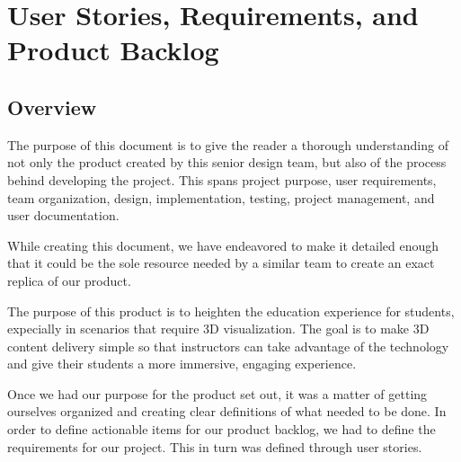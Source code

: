 
\chapter{User Stories,  Requirements, and Product Backlog}



\section{Overview}


The purpose of this document is to give the reader a thorough understanding of
not only the product created by this senior design team, but also of the
process behind developing the project. This spans project purpose, user
requirements, team organization, design, implementation, testing, project
management, and user documentation.

While creating this document, we have endeavored to make it detailed enough
that it could be the sole resource needed by a similar team to create an exact
replica of our product.

The purpose of this product is to heighten the education experience for
students, expecially in scenarios that require 3D visualization. The goal is to
make 3D content delivery simple so that instructors can take advantage of the
technology and give their students a more immersive, engaging experience.

Once we had our purpose for the product set out, it was a matter of getting
ourselves organized and creating clear definitions of what needed to be done.
In order to define actionable items for our product backlog, we had to define
the requirements for our project. This in turn was defined through user stories.






